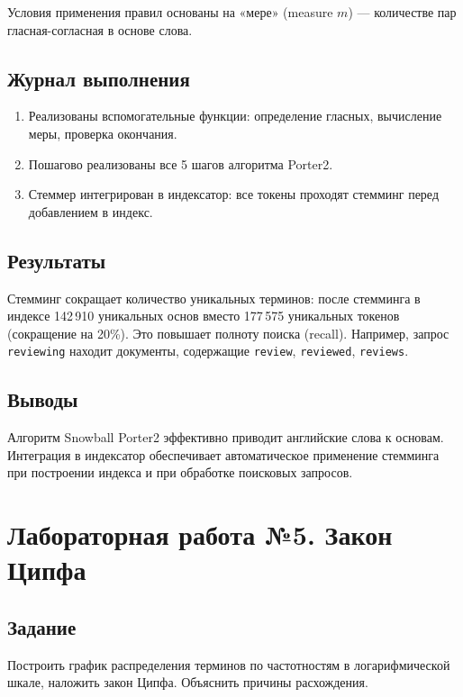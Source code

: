 \documentclass[a4paper,12pt]{article}
\begin{document}
Условия применения правил основаны на «мере» (measure $m$) --- количестве пар гласная-согласная в основе слова.

\subsection{Журнал выполнения}

\begin{enumerate}
    \item Реализованы вспомогательные функции: определение гласных, вычисление меры, проверка окончания.
    \item Пошагово реализованы все 5 шагов алгоритма Porter2.
    \item Стеммер интегрирован в индексатор: все токены проходят стемминг перед добавлением в индекс.
\end{enumerate}

\subsection{Результаты}

Стемминг сокращает количество уникальных терминов: после стемминга в индексе 142\,910 уникальных основ вместо 177\,575 уникальных токенов (сокращение на 20\%). Это повышает полноту поиска (recall). Например, запрос \texttt{reviewing} находит документы, содержащие \texttt{review}, \texttt{reviewed}, \texttt{reviews}.

\subsection{Выводы}

Алгоритм Snowball Porter2 эффективно приводит английские слова к основам. Интеграция в индексатор обеспечивает автоматическое применение стемминга при построении индекса и при обработке поисковых запросов.


\newpage
\section{Лабораторная работа №5. Закон Ципфа}

\subsection{Задание}

Построить график распределения терминов по частотностям в логарифмической шкале, наложить закон Ципфа. Объяснить причины расхождения.
\end{document}
